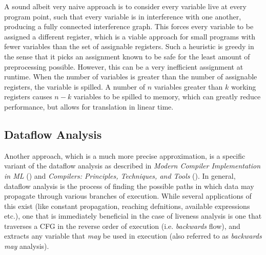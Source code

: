 \documentclass{article}
\begin{document}

A sound albeit very naive approach is to consider every variable live at every program point, such that every variable is in interference with one another, producing a fully connected interference graph.
This forces every variable to be assigned a different register, which is a viable approach for small programs with fewer variables than the set of assignable registers.
Such a heuristic is greedy in the sense that it picks an assignment known to be safe for the least amount of preprocessing possible. However, this can be a very inefficient assignment at runtime. 
When the number of variables is greater than the number of assignable registers, the variable is spilled. A number of \(n\)  variables greater than \(k\) working registers causes \(n-k\) variables to be spilled to memory, %
which can greatly reduce performance, but  allows for translation in linear time. %

\subsection{Dataflow Analysis}


Another approach, which is a much more precise approximation, is a specific variant of the dataflow analysis as described in \textit{Modern Compiler Implementation in ML} (\cite{tiger}) and \textit{Compilers: Principles, Techniques, and Tools} (\cite{dragon}). In general, dataflow analysis is the process of finding the possible paths in which data may propagate through various branches of execution.  While several applications of this exist (like constant propagation, reaching defnitions, available expressions etc.), one that is immediately beneficial in the case of liveness analysis is one that traverses a CFG in the reverse order of execution (i.e.  \textit{backwards} flow), and extracts any variable that \textit{may} be used in execution (also referred to as \textit{backwards may} analysis). %
\end{document}

